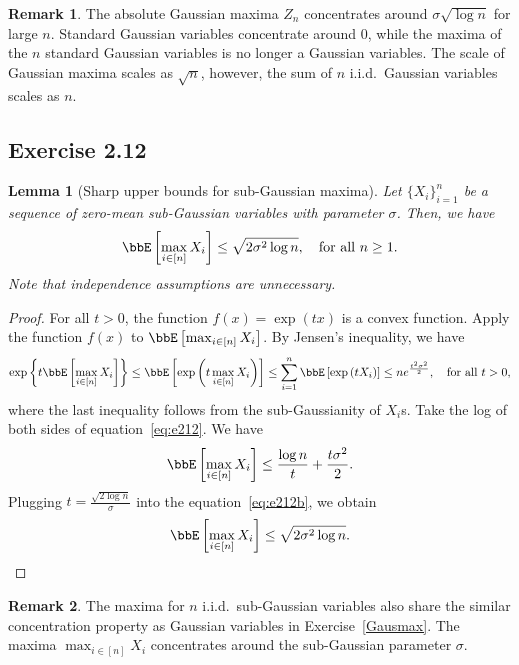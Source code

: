 \documentclass[11pt]{article}
\newcommand{\of}[1]{\left(#1\right)}
\newcommand{\off}[1]{\left[#1\right]}
\newcommand{\offf}[1]{\left\{#1\right\}}
\theoremstyle{plain}
\newtheorem{lem}{Lemma}
\theoremstyle{definition}
\newtheorem{rmk}{Remark}
\begin{document}
\begin{rmk}
	The absolute Gaussian maxima $Z_n$ concentrates around $\sigma \sqrt{\log n}$ for large $n$. Standard Gaussian variables concentrate around 0, while the maxima of the $n$ standard Gaussian variables is no longer a Gaussian variables. The scale of Gaussian maxima scales as $\sqrt{n}$, however, the sum of $n$ i.i.d.\ Gaussian variables scales as $n$.
\end{rmk}

\subsection{Exercise 2.12}
\begin{lem}[Sharp upper bounds for sub-Gaussian maxima]
	Let $\{X_i\}_{i = 1}^n$ be a sequence of zero-mean sub-Gaussian variables with parameter $\sigma$. Then, we have
	\begin{equation}
		\bbE \off{\max_{i \in [n]} X_i} \leq \sqrt{2\sigma^2 \log n}, \quad \text{for all } n \geq 1.
	\end{equation}
	Note that independence assumptions are unnecessary.
\end{lem}

\begin{proof}
	For all $t >0$, the function $f(x) = \exp \of{tx}$ is a convex function. Apply the function $f(x)$ to $\bbE \off{\max_{i \in [n]} X_i} $. By Jensen's inequality, we have
	\begin{equation}\label{eq:e212}
		\exp \offf{t \bbE \off{\max_{i \in [n]} X_i} } \leq \bbE\off{\exp \of{t \max_{i \in [n]} X_i }} \leq \sum_{i= 1}^n \bbE\off{\exp \of{t X_i }} \leq n e^{\frac{t^2 \sigma^2}{2}}, \quad \text{for all }t > 0,
	\end{equation}
	where the last inequality follows from the sub-Gaussianity of $X_i$s. Take the log of both sides of equation~\eqref{eq:e212}. We have
	\begin{equation}\label{eq:e212b}
		\bbE \off{\max_{i \in [n]} X_i}  \leq \frac{\log n}{t} + \frac{t\sigma^2}{2}.
	\end{equation}
	Plugging $t = \frac{\sqrt{2\log n} }{\sigma}$ into the equation~\eqref{eq:e212b}, we obtain
	\[ \bbE \off{\max_{i \in [n]} X_i}  \leq \sqrt{2 \sigma^2 \log n}.\]
\end{proof}

\begin{rmk}
	The maxima for $n$ i.i.d.\ sub-Gaussian variables also share the similar concentration property as Gaussian variables in Exercise~\ref{Gausmax}. The maxima $\max_{i \in [n]} X_i$ concentrates around the sub-Gaussian parameter $\sigma$.
\end{rmk}
\end{document}

